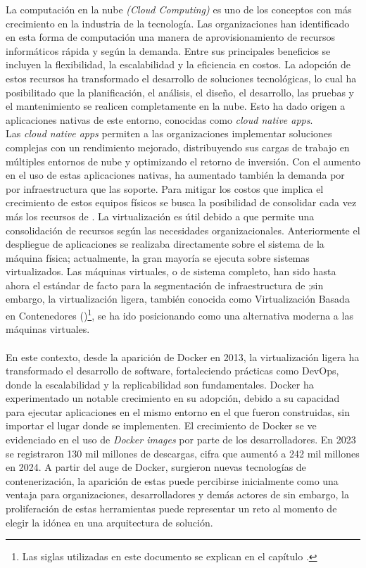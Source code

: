 \label{cap:introduccion}
La computación en la nube \textit{(Cloud Computing)} es uno de los conceptos con más crecimiento en la industria de la tecnología\citep{Jayaweera2024}. Las organizaciones han identificado en esta forma de computación una manera de aprovisionamiento de recursos informáticos rápida y según la demanda. Entre sus principales beneficios se incluyen la flexibilidad, la escalabilidad y la eficiencia en costos\citep{Ahmadi2024}. La adopción de estos recursos ha transformado el desarrollo de soluciones tecnológicas, lo cual ha posibilitado que la planificación, el análisis, el diseño, el desarrollo, las pruebas y el mantenimiento se realicen completamente en la nube. Esto ha dado origen a aplicaciones nativas de este entorno, conocidas como \textit{cloud native apps}.\\
Las \textit{cloud native apps} permiten a las organizaciones implementar soluciones complejas con un rendimiento mejorado, distribuyendo sus cargas de trabajo en múltiples entornos de nube y optimizando el retorno de inversión\citep{Alonso2023}. Con el aumento en el uso de estas aplicaciones nativas, ha aumentado también la demanda por por infraestructura que las soporte. Para mitigar los costos que implica el crecimiento de estos equipos físicos se busca la posibilidad de consolidar cada vez más los recursos de \TI. La virtualización es útil debido a que permite una consolidación de recursos según las necesidades organizacionales. Anteriormente el despliegue de aplicaciones se realizaba directamente sobre el sistema de la máquina física; actualmente, la gran mayoría se ejecuta sobre sistemas virtualizados\citep{Jain2016}. Las máquinas virtuales, o de sistema completo, han sido hasta ahora el estándar de facto para la segmentación de infraestructura de \TI;\@ sin embargo, la virtualización ligera, también conocida como Virtualización Basada en Contenedores (\textbf{\VBC})\footnote{Las siglas utilizadas en este documento se explican en el capítulo .}, se ha ido posicionando como una alternativa moderna a las máquinas virtuales.\\ \\
En este contexto, desde la aparición de Docker en 2013, la virtualización ligera ha transformado el desarrollo de software, fortaleciendo prácticas como DevOps, donde la escalabilidad y la replicabilidad son fundamentales\citep{Docker2021}. Docker ha experimentado un notable crecimiento en su adopción, debido a su capacidad para ejecutar aplicaciones en el mismo entorno en el que fueron construidas, sin importar el lugar donde se implementen. El crecimiento de Docker se ve evidenciado en el uso de \textit{Docker images} por parte de los desarrolladores. En 2023 se registraron 130 mil millones de descargas, cifra que aumentó a 242 mil millones en 2024\citep{Docker2024}. A partir del auge de Docker, surgieron nuevas tecnologías de contenerización, la aparición de estas puede percibirse inicialmente como una ventaja para organizaciones, desarrolladores y demás actores de \TI\;\@ sin embargo, la proliferación de estas herramientas puede representar un reto al momento de elegir la idónea en una arquitectura de solución.\\

